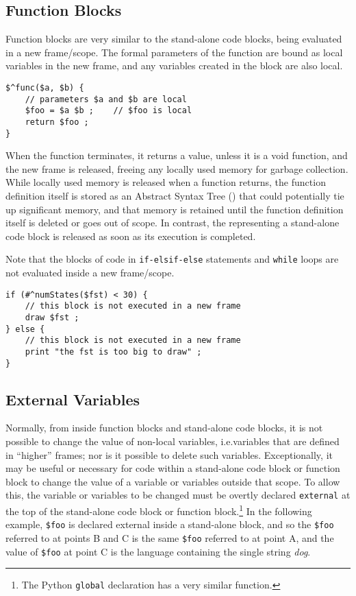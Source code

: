 \subsection{Function Blocks}

Function blocks are very similar to the stand-alone code blocks, being
evaluated in a new frame/scope.  The formal parameters of the function are
bound as local variables in the
new frame, and any variables created in the block are also local.


\begin{Verbatim}
$^func($a, $b) {
    // parameters $a and $b are local
    $foo = $a $b ;    // $foo is local
    return $foo ;
}
\end{Verbatim}

\noindent
When the function terminates, it returns a value, unless it is a void function, and the
new frame is released, freeing any locally used memory for garbage
collection.  While locally used memory is released when a function returns, the
function definition itself is stored as an Abstract Syntax Tree () that could
potentially tie up 
significant memory, and that memory is retained until the function definition
itself is deleted or goes out of scope.  In contrast, the  representing a
stand-alone code block is released as soon as its execution is completed.

Note that the blocks of code in \texttt{if-elsif-else} statements and \texttt{while}
loops are not evaluated inside a new frame/scope.

\begin{Verbatim}
if (#^numStates($fst) < 30) {
    // this block is not executed in a new frame
    draw $fst ;
} else {
    // this block is not executed in a new frame
    print "the fst is too big to draw" ;
}
\end{Verbatim}


\subsection{External Variables}

Normally, from inside function blocks and stand-alone code blocks,
it is not possible to change the value of non-local variables,
i.e.\@ variables that are defined in ``higher'' frames; nor is it
possible to delete such variables.  Exceptionally, it may be useful
or necessary for code within a stand-alone code block or function
block to change the value of a variable or variables outside that
scope.  To allow this, the variable or variables to be changed must
be overtly declared \texttt{external} at the top of the stand-alone
code block or function block.\footnote{The Python \texttt{global}
declaration has a very similar function.}  In the following
example, \verb!$foo! is declared external inside a stand-alone
block, and so the \verb!$foo! referred to at points B and C is the
same \verb!$foo! referred to at point A, and the value of
\verb!$foo! at point C is the language containing the single string
\emph{dog}.

